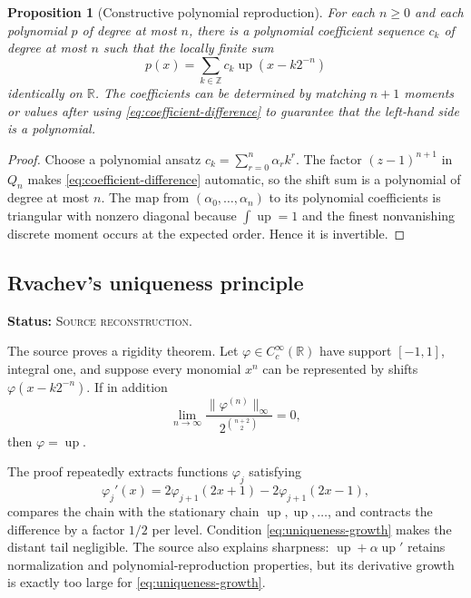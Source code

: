 \documentclass[11pt]{article}
\newtheorem{proposition}[theorem]{Proposition}
\theoremstyle{definition}
\theoremstyle{remark}
\newcommand{\Up}{\operatorname{up}}
\newcommand{\R}{\mathbb{R}}
\newcommand{\Z}{\mathbb{Z}}
\newcommand{\SourceStatus}{\textcolor{SourceBlue}{\textsc{Source reconstruction}}}
\newcommand{\status}[1]{\par\smallskip\noindent\textbf{Status:} #1.\par\smallskip}
\begin{document}
\begin{proposition}[Constructive polynomial reproduction]
\label{prop:constructive-reproduction}
For each \(n\ge0\) and each polynomial \(p\) of degree at most \(n\), there is a polynomial coefficient sequence \(c_k\) of degree at most \(n\) such that the locally finite sum
\begin{equation}
  p(x)=\sum_{k\in\Z}c_k\Up(x-k2^{-n})
  \label{eq:poly-reproduce}
\end{equation}
identically on \(\R\).  The coefficients can be determined by matching \(n+1\) moments or values after using \eqref{eq:coefficient-difference} to guarantee that the left-hand side is a polynomial.
\end{proposition}

\begin{proof}
Choose a polynomial ansatz \(c_k=\sum_{r=0}^{n}\alpha_r k^r\).  The factor \((z-1)^{n+1}\) in \(Q_n\) makes \eqref{eq:coefficient-difference} automatic, so the shift sum is a polynomial of degree at most \(n\).  The map from \((\alpha_0,\ldots,\alpha_n)\) to its polynomial coefficients is triangular with nonzero diagonal because \(\int\Up=1\) and the finest nonvanishing discrete moment occurs at the expected order.  Hence it is invertible.
\end{proof}

\subsection{Rvachev's uniqueness principle}
\status{\SourceStatus}

The source proves a rigidity theorem.  Let \(\varphi\in C_c^\infty(\R)\) have support \([-1,1]\), integral one, and suppose every monomial \(x^n\) can be represented by shifts \(\varphi(x-k2^{-n})\).  If in addition
\begin{equation}
  \lim_{n\to\infty}
  \frac{\|\varphi^{(n)}\|_\infty}
       {2^{\binom{n+2}{2}}}=0,
  \label{eq:uniqueness-growth}
\end{equation}
then \(\varphi=\Up\).

The proof repeatedly extracts functions \(\varphi_j\) satisfying
\begin{equation}
  \varphi_j'(x)=2\varphi_{j+1}(2x+1)-2\varphi_{j+1}(2x-1),
  \label{eq:phi-chain}
\end{equation}
compares the chain with the stationary chain \(\Up,\Up,\ldots\), and contracts the difference by a factor \(1/2\) per level.  Condition \eqref{eq:uniqueness-growth} makes the distant tail negligible.  The source also explains sharpness: \(\Up+\alpha\Up'\) retains normalization and polynomial-reproduction properties, but its derivative growth is exactly too large for \eqref{eq:uniqueness-growth}.
\end{document}
